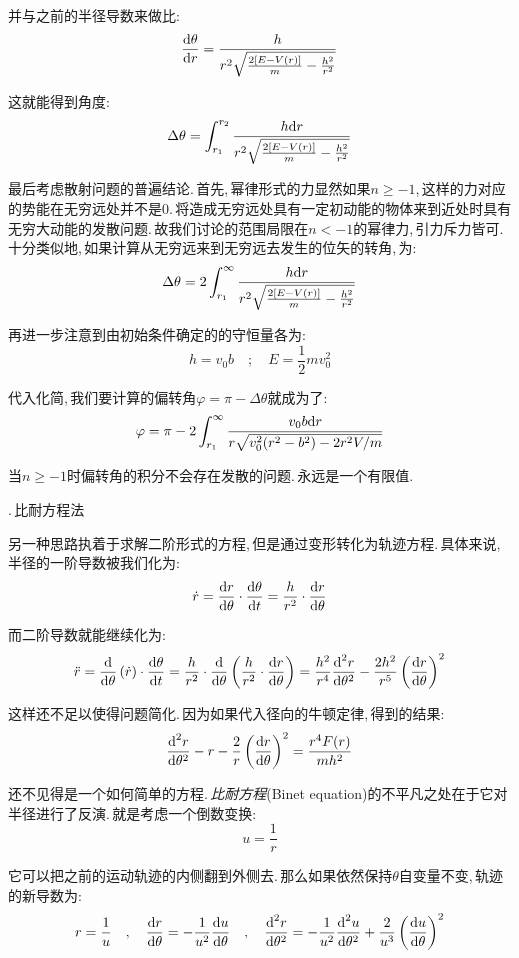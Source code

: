 并与之前的半径导数来做比:
\[\frac{\textrm{d} \theta}{\textrm{d} r}=\frac{h}{r^2\sqrt{\frac{2[E-V(r)]}{m}-\frac{h^2}{r^2}}}\]

这就能得到角度:
\[\Delta \theta =\int_{r_1}^{r_2}\frac{h\textrm{d} r}{r^2\sqrt{\frac{2[E-V(r)]}{m}-\frac{h^2}{r^2}}}\]

最后考虑散射问题的普遍结论.\,首先,\,幂律形式的力显然如果$n\geq-1$,\,这样的力对应的势能在无穷远处并不是$0$.\,将造成无穷远处具有一定初动能的物体来到近处时具有无穷大动能的发散问题.\,故我们讨论的范围局限在$n<-1$的幂律力,\,引力斥力皆可.\,十分类似地,\,如果计算从无穷远来到无穷远去发生的位矢的转角,\,为:
\[\Delta \theta =2\int_{r_1}^{\infty}\frac{h\textrm{d} r}{r^2\sqrt{\frac{2[E-V(r)]}{m}-\frac{h^2}{r^2}}}\]

再进一步注意到由初始条件确定的的守恒量各为:
\[h=v_0b\quad;\quad E=\frac{1}{2}mv_0^2\]

代入化简,\,我们要计算的偏转角$\varphi=\pi-\Delta\theta$就成为了:
\[\varphi=\pi-2\int_{r_1}^\infty \frac{v_0b\textrm{d} r}{r\sqrt{v_0^2(r^2-b^2)-2r^2V/m}}\]

当$n\geq-1$时偏转角的积分不会存在发散的问题.\,永远是一个有限值.

\vspace{0.5cm}

{.\,比耐方程法}

\vspace{0.2cm}

另一种思路执着于求解二阶形式的方程,\,但是通过变形转化为轨迹方程.\,具体来说,\,半径的一阶导数被我们化为:
\[\dot{r}=\frac{\textrm{d} r}{\textrm{d} \theta}\cdot\frac{\textrm{d} \theta}{\textrm{d} t}=\frac{h}{r^2}\cdot \frac{\textrm{d} r}{\textrm{d} \theta}\]

而二阶导数就能继续化为:
\[\ddot{r}=\frac{\textrm{d} }{\textrm{d} \theta}\left(\dot{r}\right)\cdot\frac{\textrm{d} \theta}{\textrm{d} t}=\frac{h}{r^2}\cdot\frac{\textrm{d} }{\textrm{d} \theta}\left(\frac{h}{r^2}\cdot \frac{\textrm{d} r}{\textrm{d} \theta}\right)=\frac{h^2}{r^4}\frac{\textrm{d}^2 r}{\textrm{d} \theta^2}-\frac{2h^2}{r^5}\left(\frac{\textrm{d} r}{\textrm{d} \theta}\right)^2\]

这样还不足以使得问题简化.\,因为如果代入径向的牛顿定律,\,得到的结果:
\[\frac{\textrm{d}^2 r}{\textrm{d} \theta^2}-r-\frac{2}{r}\left(\frac{\textrm{d} r}{\textrm{d} \theta}\right)^2=\frac{r^4F(r)}{mh^2}\]

还不见得是一个如何简单的方程.\,\emph{比耐方程}(Binet equation)的不平凡之处在于它对半径进行了反演.\,就是考虑一个倒数变换:
\[u=\frac{1}{r}\]

它可以把之前的运动轨迹的内侧翻到外侧去.\,那么如果依然保持$\theta$自变量不变,\,轨迹的新导数为:
\[r=\frac{1}{u}\quad,\quad \frac{\textrm{d} r}{\textrm{d} \theta}=-\frac{1}{u^2}\frac{\textrm{d} u}{\textrm{d} \theta}\quad,\quad \frac{\textrm{d}^2 r}{\textrm{d} \theta^2}=-\frac{1}{u^2}\frac{\textrm{d}^2 u}{\textrm{d} \theta^2}+\frac{2}{u^3}\left(\frac{\textrm{d} u}{\textrm{d} \theta}\right)^2\]

